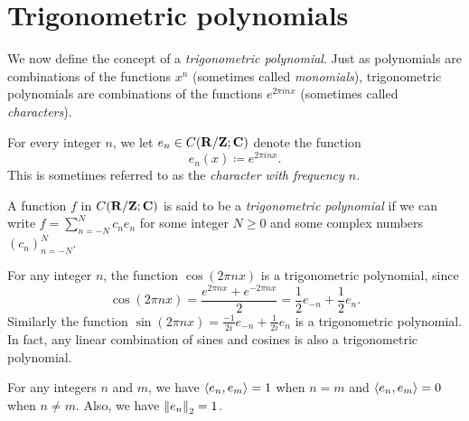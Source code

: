 \section{Trigonometric polynomials}\label{sec 5.3}

\begin{note}
    We now define the concept of a \emph{trigonometric polynomial}.
    Just as polynomials are combinations of the functions \(x^n\) (sometimes called \emph{monomials}), trigonometric polynomials are combinations of the functions \(e^{2 \pi i n x}\) (sometimes called \emph{characters}).
\end{note}

\begin{definition}[Characters]\label{5.3.1}
    For every integer \(n\), we let \(e_n \in C(\R / \Z ; \C)\) denote the function
    \[
        e_n(x) \coloneqq e^{2 \pi i n x}.
    \]
    This is sometimes referred to as the \emph{character with frequency \(n\)}.
\end{definition}

\begin{definition}\label{5.3.2}
    A function \(f\) in \(C(\R / \Z ; \C)\) is said to be a \emph{trigonometric polynomial} if we can write
    \(f = \sum_{n = -N}^N c_n e_n\) for some integer \(N \geq 0\) and some complex numbers \((c_n)_{n = -N}^N\).
\end{definition}

\setcounter{theorem}{3}
\begin{example}\label{5.3.4}
    For any integer \(n\), the function \(\cos(2 \pi n x)\) is a trigonometric polynomial, since
    \[
        \cos(2 \pi n x) = \frac{e^{2 \pi n x} + e^{- 2 \pi n x}}{2} = \frac{1}{2} e_{-n} + \frac{1}{2} e_n.
    \]
    Similarly the function \(\sin(2 \pi n x) = \frac{-1}{2i} e_{-n} + \frac{1}{2i} e_n\) is a trigonometric polynomial.
    In fact, any linear combination of sines and cosines is also a trigonometric polynomial.
\end{example}

\begin{lemma}\label{5.3.5}
    For any integers \(n\) and \(m\), we have \(\inner*{e_n, e_m} = 1\) when \(n = m\) and \(\inner*{e_n, e_m} = 0\) when \(n \neq m\).
    Also, we have \(\norm*{e_n}_2 = 1\).
\end{lemma}

